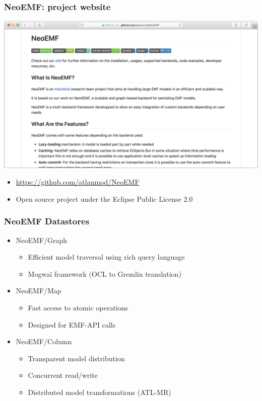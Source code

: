 \documentclass[10pt]{beamer}
\begin{document}
\begin{frame}[t]\frametitle{NeoEMF: project website}
    \begin{center}
      \includegraphics[width=\textwidth]{neoemf-github.png}
    \end{center}
	
    \begin{itemize}
    \item \url{https://github.com/atlanmod/NeoEMF}
    \item Open source project under the Eclipse Public License 2.0
    \end{itemize}
\end{frame}

\begin{frame}[c]\frametitle{NeoEMF Datastores~\cite{DBLP:conf/models/DanielSBTVGC16}}
	\begin{itemize}
		\item NeoEMF/Graph
		\begin{itemize}
			\item Efficient model traversal using rich query language
			\item Mogwaï framework (OCL to Gremlin translation)
		\end{itemize}
		\item NeoEMF/Map
		\begin{itemize}
			\item Fast access to atomic operations
			\item Designed for EMF-API calls
		\end{itemize}
		\item NeoEMF/Column
		\begin{itemize}
			\item Transparent model distribution
			\item Concurrent read/write
			\item Distributed model transformations (ATL-MR)
		\end{itemize}
	\end{itemize}
\end{frame}
\end{document}

